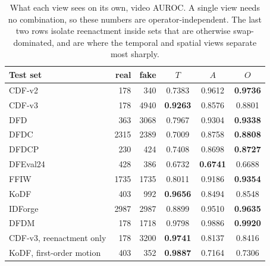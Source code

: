 \begin{table}[t]
\centering
\caption{What each view sees on its own, video AUROC. A single view needs no combination, so these numbers are operator-independent. The last two rows isolate reenactment inside sets that are otherwise swap-dominated, and are where the temporal and spatial views separate most sharply.}
\label{tab:perview}
\small
\begin{tabular}{lrrccc}
\toprule
Test set & real & fake & $T$ & $A$ & $O$ \\
\midrule
CDF-v2 & 178 & 340 & 0.7383 & 0.9612 & \textbf{0.9736} \\
CDF-v3 & 178 & 4940 & \textbf{0.9263} & 0.8576 & 0.8801 \\
DFD & 363 & 3068 & 0.7967 & 0.9304 & \textbf{0.9338} \\
DFDC & 2315 & 2389 & 0.7009 & 0.8758 & \textbf{0.8808} \\
DFDCP & 230 & 424 & 0.7408 & 0.8698 & \textbf{0.8727} \\
DFEval24 & 428 & 386 & 0.6732 & \textbf{0.6741} & 0.6688 \\
FFIW & 1735 & 1735 & 0.8011 & 0.9186 & \textbf{0.9354} \\
KoDF & 403 & 992 & \textbf{0.9656} & 0.8494 & 0.8548 \\
IDForge & 2987 & 2987 & 0.8899 & 0.9510 & \textbf{0.9635} \\
DFDM & 178 & 1718 & 0.9798 & 0.9886 & \textbf{0.9920} \\
\midrule
CDF-v3, reenactment only & 178 & 3200 & \textbf{0.9741} & 0.8137 & 0.8416 \\
KoDF, first-order motion & 403 & 352 & \textbf{0.9887} & 0.7164 & 0.7306 \\
\bottomrule
\end{tabular}
\end{table}
